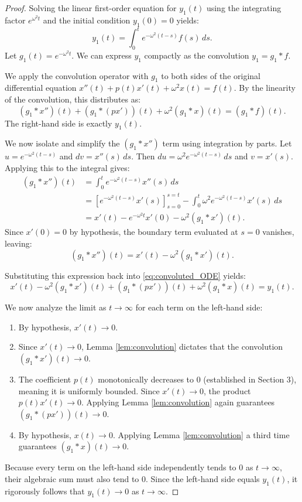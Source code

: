 \documentclass[10pt,reqno]{amsart}
\theoremstyle{definition}
\begin{document}
	\begin{proof}
		Solving the linear first-order equation for $y_1(t)$ using the integrating factor $e^{\omega^2 t}$ and the initial condition $y_1(0) = 0$ yields:
		\[ y_1(t) = \int_0^t e^{-\omega^2(t-s)} f(s) \, ds. \]
		Let $g_1(t) = e^{-\omega^2 t}$. We can express $y_1$ compactly as the convolution $y_1 = g_1 * f$.
		
		We apply the convolution operator with $g_1$ to both sides of the original differential equation $x''(t) + p(t)x'(t) + \omega^2 x(t) = f(t)$. By the linearity of the convolution, this distributes as:
		\begin{equation} \label{eq:convoluted_ODE}
			(g_1 * x'')(t) + (g_1 * (px'))(t) + \omega^2(g_1 * x)(t) = (g_1 * f)(t).
		\end{equation}
		The right-hand side is exactly $y_1(t)$.
		
		We now isolate and simplify the $(g_1 * x'')$ term using integration by parts. Let $u = e^{-\omega^2(t-s)}$ and $dv = x''(s) \, ds$. Then $du = \omega^2 e^{-\omega^2(t-s)} \, ds$ and $v = x'(s)$. Applying this to the integral gives:
		\begin{align*}
			(g_1 * x'')(t) &= \int_0^t e^{-\omega^2(t-s)} x''(s) \, ds \\
			&= \left[ e^{-\omega^2(t-s)} x'(s) \right]_{s=0}^{s=t} - \int_0^t \omega^2 e^{-\omega^2(t-s)} x'(s) \, ds \\
			&= x'(t) - e^{-\omega^2 t} x'(0) - \omega^2 (g_1 * x')(t).
		\end{align*}
		Since $x'(0) = 0$ by hypothesis, the boundary term evaluated at $s=0$ vanishes, leaving:
		\[ (g_1 * x'')(t) = x'(t) - \omega^2 (g_1 * x')(t). \]
		
		Substituting this expression back into \eqref{eq:convoluted_ODE} yields:
		\[ x'(t) - \omega^2 (g_1 * x')(t) + (g_1 * (px'))(t) + \omega^2(g_1 * x)(t) = y_1(t). \]
		
		We now analyze the limit as $t \to \infty$ for each term on the left-hand side:
		\begin{enumerate}
			\item By hypothesis, $x'(t) \to 0$.
			\item Since $x'(t) \to 0$, Lemma \ref{lem:convolution} dictates that the convolution $(g_1 * x')(t) \to 0$.
			\item The coefficient $p(t)$ monotonically decreases to $0$ (established in Section 3), meaning it is uniformly bounded. Since $x'(t) \to 0$, the product $p(t)x'(t) \to 0$. Applying Lemma \ref{lem:convolution} again guarantees $(g_1 * (px'))(t) \to 0$.
			\item By hypothesis, $x(t) \to 0$. Applying Lemma \ref{lem:convolution} a third time guarantees $(g_1 * x)(t) \to 0$.
		\end{enumerate}
		
		Because every term on the left-hand side independently tends to $0$ as $t \to \infty$, their algebraic sum must also tend to $0$. Since the left-hand side equals $y_1(t)$, it rigorously follows that $y_1(t) \to 0$ as $t \to \infty$.
	\end{proof}
	
\end{document}
